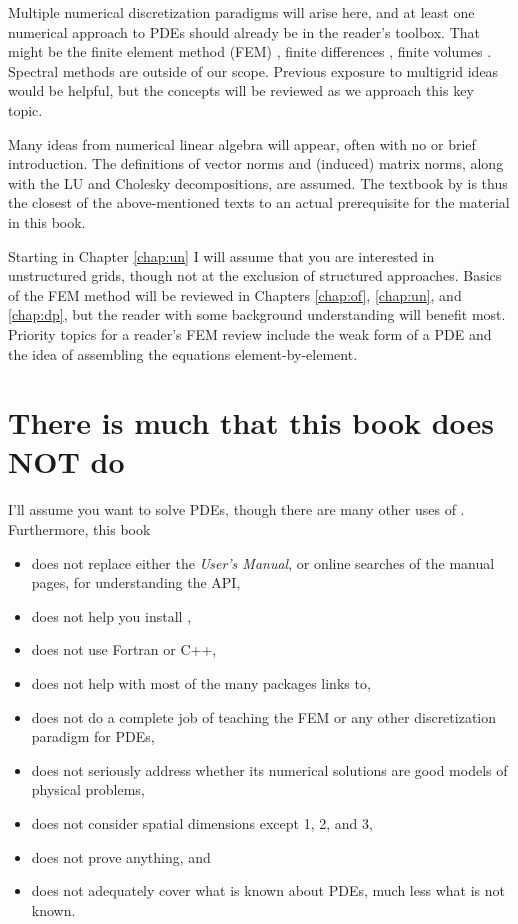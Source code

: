 Multiple numerical discretization paradigms will arise here, and at least one numerical approach to PDEs should already be in the reader's toolbox.  That might be the finite element method (FEM) \citep{Braess2007,Elmanetal2005,KarniadakisSherwin2013}, finite differences \citep{MortonMayers2005}, finite volumes \citep{LeVeque2002}.  Spectral methods \citep{Trefethen2000} are outside of our scope.  Previous exposure to multigrid ideas \citep{Briggsetal2000} would be helpful, but the concepts will be reviewed as we approach this key topic.

Many ideas from numerical linear algebra \citep{Greenbaum1997,TrefethenBau1997} will appear, often with no or brief introduction.  The definitions of vector norms and (induced) matrix norms, along with the LU and Cholesky decompositions, are assumed.  The textbook by \citet{TrefethenBau1997} is thus the closest of the above-mentioned texts to an actual prerequisite for the material in this book.

Starting in Chapter \ref{chap:un} I will assume that you are interested in unstructured grids, though not at the exclusion of structured approaches.  Basics of the FEM method will be reviewed in Chapters \ref{chap:of}, \ref{chap:un}, and \ref{chap:dp}, but the reader with some background understanding will benefit most.  Priority topics for a reader's FEM review include the weak form of a PDE and the idea of assembling the equations element-by-element.


\section{There is much that this book does NOT do}

I'll assume you want to solve PDEs, though there are many other uses of \PETSc.  Furthermore, this book\begin{itemize}
\item  does not replace either the \PETSc \emph{User's Manual}, or online searches of the \PETSc manual pages, for understanding the API,
\item  does not help you install \PETSc,
\item  does not use Fortran or C++,
\item  does not help with most of the many packages \PETSc links to,
\item  does not do a complete job of teaching the FEM or any other discretization paradigm for PDEs,
\item  does not seriously address whether its numerical solutions are good models of physical problems,
\item  does not consider spatial dimensions except 1, 2, and 3,
\item  does not prove anything, and
\item  does not adequately cover what is known about PDEs, much less what is not known.
\end{itemize}


